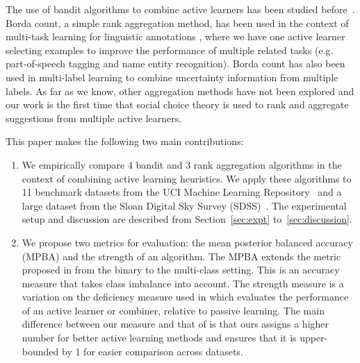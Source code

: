 \documentclass[fleqn,10pt,lineno]{wlpeerj} %
\begin{document}
The use of bandit algorithms to combine active learners has been studied
before~\citep{baram04, hsu15}. Borda count, a simple rank aggregation method,
has been used in the context of multi-task learning for linguistic annotations
\citep{reichart08}, where we have one active learner selecting examples to
improve the performance of multiple related tasks (e.g. part-of-speech tagging
and name entity recognition). Borda count has also been used in multi-label
learning \citep{reyes17} to combine uncertainty information from multiple
labels. As far as we know, other aggregation methods have not been explored
and our work is the first time that social choice theory is used to rank and
aggregate suggestions from multiple active learners.

This paper makes the following two main contributions:
\begin{enumerate}
	\item We empirically compare 4 bandit and 3 rank aggregation algorithms in
	the context of combining active learning heuristics. We apply these
	algorithms to 11 benchmark datasets from the UCI Machine Learning
	Repository~\citep{lichman13} and a large dataset from the Sloan Digital Sky
	Survey (SDSS)~\citep{alam15}. The experimental setup and discussion are
	described from Section~\ref{sec:expt} to~\ref{sec:discussion}.
	\item We propose two metrics for evaluation: the mean posterior balanced
	accuracy (MPBA) and the strength of an algorithm. The MPBA extends the
	metric proposed in \cite{brodersen10} from the binary to the multi-class
	setting. This is an accuracy measure that takes class imbalance into
	account. The strength measure is a variation on the deficiency measure used
	in \cite{baram04} which evaluates the performance of an active learner or
	combiner, relative to passive learning. The main difference between our
	measure and that of \cite{baram04} is that ours assigns a higher number for
	better active learning methods and ensures that it is upper-bounded by 1
	for easier comparison across datasets.
\end{enumerate}
\end{document}
